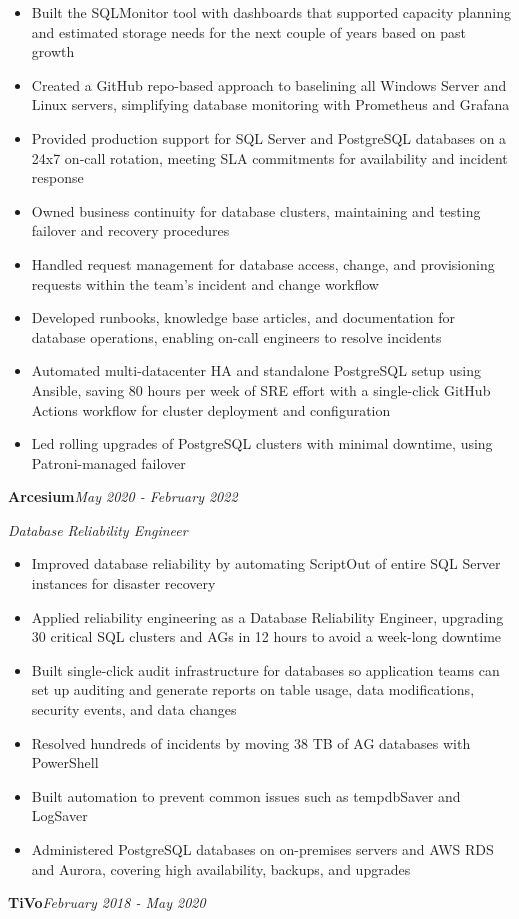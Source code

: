 \documentclass[10pt,a4paper]{article}
\begin{document}
\begin{itemize}
  \item Built the SQLMonitor tool with dashboards that supported capacity planning and estimated storage needs for the next couple of years based on past growth
  \item Created a GitHub repo-based approach to baselining all Windows Server and Linux servers, simplifying database monitoring with Prometheus and Grafana
  \item Provided production support for SQL Server and PostgreSQL databases on a 24x7 on-call rotation, meeting SLA commitments for availability and incident response
  \item Owned business continuity for database clusters, maintaining and testing failover and recovery procedures
  \item Handled request management for database access, change, and provisioning requests within the team's incident and change workflow
  \item Developed runbooks, knowledge base articles, and documentation for database operations, enabling on-call engineers to resolve incidents
  \item Automated multi-datacenter HA and standalone PostgreSQL setup using Ansible, saving 80 hours per week of SRE effort with a single-click GitHub Actions workflow for cluster deployment and configuration
  \item Led rolling upgrades of PostgreSQL clusters with minimal downtime, using Patroni-managed failover
\end{itemize}
\vspace{14.7pt}
\noindent\textbf{Arcesium}\hfill \textit{May 2020 - February 2022}

\textit{Database Reliability Engineer}\\[-5pt]
\begin{itemize}
  \item Improved database reliability by automating ScriptOut of entire SQL Server instances for disaster recovery
  \item Applied reliability engineering as a Database Reliability Engineer, upgrading 30 critical SQL clusters and AGs in 12 hours to avoid a week-long downtime
  \item Built single-click audit infrastructure for databases so application teams can set up auditing and generate reports on table usage, data modifications, security events, and data changes
  \item Resolved hundreds of incidents by moving 38 TB of AG databases with PowerShell
  \item Built automation to prevent common issues such as tempdbSaver and LogSaver
  \item Administered PostgreSQL databases on on-premises servers and AWS RDS and Aurora, covering high availability, backups, and upgrades
\end{itemize}
\vspace{14.7pt}
\noindent\textbf{TiVo}\hfill \textit{February 2018 - May 2020}
\end{document}
